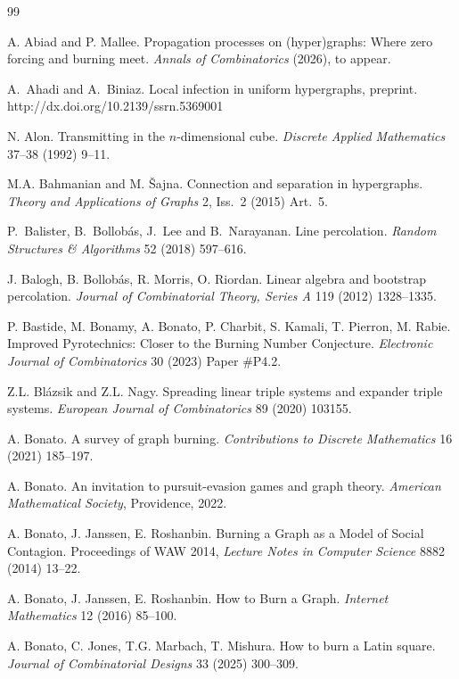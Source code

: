 \documentclass[12pt]{article}
\theoremstyle{definition}
\numberwithin{table}{section}
\begin{document}
\begin{thebibliography}{99}

 A. Abiad and P. Mallee.  Propagation processes on (hyper)graphs: Where zero forcing and burning meet.  \emph{Annals of Combinatorics} (2026), to appear.

 A.\ Ahadi and A.\ Biniaz.  Local infection in uniform hypergraphs, preprint.  http://dx.doi.org/10.2139/ssrn.5369001 

 N. Alon. Transmitting in the $n$-dimensional cube. \emph{Discrete Applied Mathematics}  37--38 (1992) 9--11. 

 M.A. Bahmanian and M. \v{S}ajna. Connection and separation in hypergraphs. \emph{Theory and Applications of Graphs} 2, Iss.~2 (2015) Art.~5.

  P.\ Balister, B.\ Bollob\'{a}s, J.\ Lee and B.\ Narayanan.  Line percolation.  {\em Random Structures \& Algorithms} 52 (2018) 597--616.

 J. Balogh, B. Bollob\'{a}s, R. Morris, O. Riordan. Linear algebra and bootstrap percolation. \emph{Journal of Combinatorial Theory, Series A} 119 (2012) 1328--1335.

 P. Bastide, M. Bonamy, A. Bonato, P. Charbit, S. Kamali, T. Pierron, M. Rabie. Improved Pyrotechnics: Closer to the Burning Number Conjecture. 
\emph{Electronic Journal of Combinatorics} 30 (2023) Paper \#P4.2.

 Z.L. Bl\'{a}zsik and Z.L. Nagy.  Spreading linear triple systems and expander triple systems.  \emph{European Journal of Combinatorics} 89 (2020) 103155.

 A. Bonato. A survey of graph burning. \emph{Contributions to Discrete Mathematics} 16 (2021) 185--197.

 A. Bonato.
An invitation to pursuit-evasion games and graph theory.
\emph{American Mathematical Society}, Providence, 2022.

 A. Bonato, J. Janssen, E. Roshanbin. Burning a Graph as a Model of Social Contagion. Proceedings of WAW 2014, \emph{Lecture Notes in Computer Science} 8882 (2014) 13--22.

 A. Bonato, J. Janssen, E. Roshanbin. How to Burn a Graph. \emph{Internet Mathematics} 12 (2016) 85--100.

 A. Bonato, C. Jones, T.G. Marbach, T. Mishura.
How to burn a Latin square. \emph{Journal of Combinatorial Designs} 33
 (2025) 300--309.


\end{thebibliography}
\end{document}
